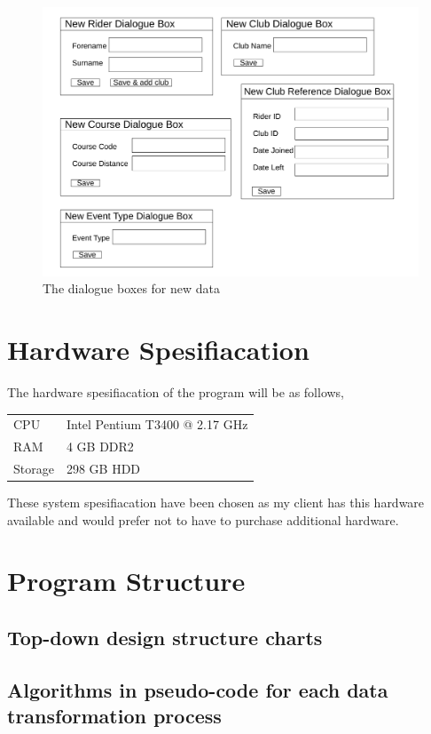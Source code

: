 \begin{figure}[H]
	\includegraphics[width=\textwidth]{./UIDesign/Dialogs.pdf}
	\caption{The dialogue boxes for new data} \label{fig:The dialogue boxes for new data} 	
\end{figure}

\section{Hardware Spesifiacation}

The hardware spesifiacation of the program will be as follows,

\begin{tabular}{ll}
CPU & Intel Pentium T3400 @ 2.17 GHz\\
RAM & 4 GB DDR2 \\
Storage & 298 GB HDD \\
\end{tabular}

These system spesifiacation have been chosen as my client has this hardware available and would prefer not to have to purchase additional hardware.

\section{Program Structure}

\subsection{Top-down design structure charts}

\subsection{Algorithms in pseudo-code for each data transformation process}

